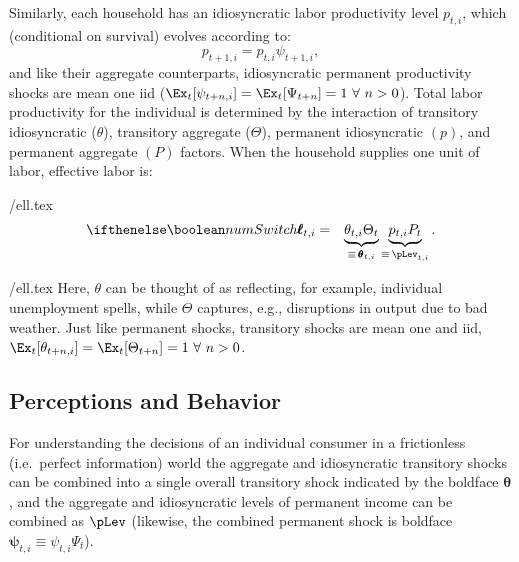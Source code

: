 \documentclass[titlepage]{\econtex}
\begin{document}
Similarly, each household has an idiosyncratic labor productivity level $p_{t,i}$, which (conditional on survival) evolves according to:
\begin{equation}
p_{t+1,i} = p_{t,i} \psi_{t+1,i},  \label{eq:IndRandWalk}
\end{equation}
and like their aggregate counterparts, idiosyncratic permanent productivity shocks are mean
one iid ($\Ex_{t}[\psi_{t+n,i}]=\Ex_{t}[\Psi_{t+n}]= 1~\forall ~n>0$).
Total labor productivity for the individual is determined by the interaction of transitory idiosyncratic
($\theta$), transitory aggregate ($\Theta$), permanent idiosyncratic $({p})$, and permanent aggregate
$({P})$ factors.  When the household supplies one unit of labor, effective labor is:
\begin{verbatimwrite}{\eq/ell.tex}
\newcommand{\TranShocktpOne }{\Theta_{t}}
\begin{eqnarray}
  \label{eq:ell}
\ifnumSw  \pmb{\ell}_{t,i} & = & \underbrace{\theta_{t,i}\TranShocktpOne}_{\equiv\,\pmb{\theta}_{t,i}}\underbrace{{p}_{t,i} {P}_{t}}_{\equiv\,\pLev_{t,i}}.
\end{eqnarray}
\end{verbatimwrite}
 {\eq/ell.tex} Here, $\theta$ can be thought of as reflecting, for example, individual unemployment spells, while $\Theta$ captures, e.g., disruptions in output due to bad weather.  Just like permanent shocks, transitory shocks are mean one and iid, $\Ex_{t}[\theta_{t+n,i}]=\Ex_{t}[\Theta_{t+n}]=1~\forall~n>0$.  


\subsection{Perceptions and Behavior}

For understanding the decisions of an individual consumer in a frictionless (i.e.\ perfect information) world the aggregate and idiosyncratic transitory shocks can be combined into a single overall transitory shock indicated by the boldface $\pmb{\theta}$, and the aggregate and idiosyncratic levels of permanent income can be combined as $\pLev$ (likewise, the combined permanent shock is boldface $\pmb{\psi}_{t,i}\equiv \psi_{t,i} \Psi_{t}$).
\end{document}
